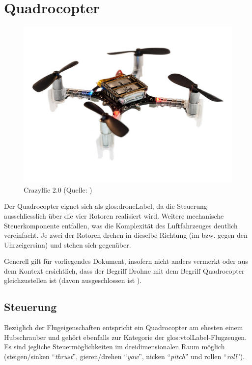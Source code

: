 \section{Quadrocopter}
\begin{figure}
	\includegraphics[width=1.0\linewidth]{images/analysis/crazyflize.jpg}
	\caption[Crazyflie 2.0]{Crazyflie 2.0 (Quelle: )}
\end{figure}
Der Quadrocopter eignet sich als \gls{glos:droneLabel}, da die Steuerung ausschliesslich über die vier Rotoren realisiert wird.
Weitere mechanische Steuerkomponente entfallen, was die Komplexität des Luftfahrzeuges deutlich vereinfacht.
Je zwei der Rotoren drehen in dieselbe Richtung (im bzw. gegen den Uhrzeigersinn) und stehen sich gegenüber.

Generell gilt für vorliegendes Dokument, insofern nicht anders vermerkt oder aus dem Kontext ersichtlich, dass der Begriff Drohne mit dem Begriff Quadrocopter gleichzustellen ist (davon ausgeschlossen ist ).

\subsection{Steuerung}
Bezüglich der Flugeigenschaften entspricht ein Quadrocopter am ehesten einem Hubschrauber und gehört ebenfalls zur Kategorie der  \gls{glos:vtolLabel}-Flugzeugen.
Es sind jegliche Steuermöglichkeiten im dreidimensionalen Raum möglich (steigen/sinken "`\textit{thrust}"', gieren/drehen "`\textit{yaw}"', nicken "`\textit{pitch}"' und rollen "`\textit{roll}"').

